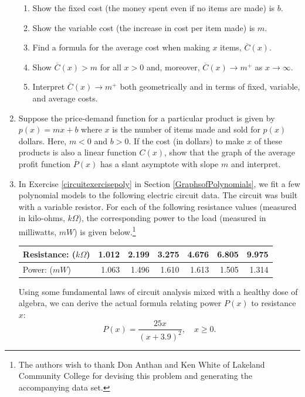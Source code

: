 \documentclass{ximera}
\begin{document}
\begin{enumerate}
\begin{enumerate}
\item  Show the fixed cost (the money spent even if no items are made) is $b$.
\item  Show the variable cost (the increase in cost per item made) is $m$.
\item  Find a formula for the average cost when making $x$ items, $\overline{C}(x)$.
\item  Show $\overline{C}(x) > m$ for all $x>0$ and, moreover,   $\overline{C}(x)  \rightarrow m^{+}$ as $x \rightarrow \infty$.
\item  Interpret $\overline{C}(x)  \rightarrow m^{+}$ both geometrically and in terms of fixed, variable, and average costs.

\end{enumerate}

\item  \label{slantyintaverageprofitexercise} Suppose the price-demand function for a particular product is given by $p(x) = mx + b$  where $x$ is the number of items made and sold for $p(x)$ dollars.  Here,  $m<0$ and $b>0$.  If the cost (in dollars) to make $x$ of these products is also a linear  function $C(x)$, show that the graph of the average profit function $\overline{P}(x)$ has a slant asymptote with slope $m$ and interpret.

\item In Exercise \ref{circuitexercisepoly} in Section \ref{GraphsofPolynomials}, we fit a few polynomial models to the following electric circuit data. The circuit was built with a variable resistor.  For each of the following resistance values (measured in kilo-ohms, $k \Omega$),  the corresponding power to the load (measured in milliwatts, $mW$) is given below.\footnote{The authors wish to thank Don Anthan and Ken White of Lakeland Community College for devising this problem and generating the accompanying data set.}


\smallskip

\noindent \begin{tabular}{|l|r|r|r|r|r|r|} \hline
Resistance: ($k \Omega$) & 1.012 & 2.199 & 3.275 & 4.676 & 6.805 & 9.975 \\ \hline
Power: ($mW$) & 1.063 & 1.496 & 1.610 & 1.613 & 1.505 & 1.314 \\ \hline
\end{tabular}

\smallskip

\noindent Using some fundamental laws of circuit analysis mixed with a healthy dose of algebra, we can derive the actual formula relating power $P(x)$ to resistance $x$:   \[P(x) = \frac{25x}{(x + 3.9)^2}, \quad x \geq 0.\]


\end{enumerate}
\end{document}
